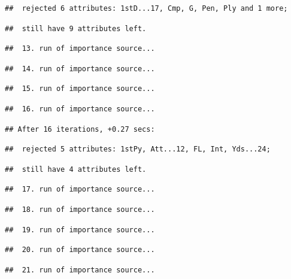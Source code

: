 \documentclass[
]{article}
\begin{document}
\begin{verbatim}
##  rejected 6 attributes: 1stD...17, Cmp, G, Pen, Ply and 1 more;
\end{verbatim}

\begin{verbatim}
##  still have 9 attributes left.
\end{verbatim}

\begin{verbatim}
##  13. run of importance source...
\end{verbatim}

\begin{verbatim}
##  14. run of importance source...
\end{verbatim}

\begin{verbatim}
##  15. run of importance source...
\end{verbatim}

\begin{verbatim}
##  16. run of importance source...
\end{verbatim}

\begin{verbatim}
## After 16 iterations, +0.27 secs:
\end{verbatim}

\begin{verbatim}
##  rejected 5 attributes: 1stPy, Att...12, FL, Int, Yds...24;
\end{verbatim}

\begin{verbatim}
##  still have 4 attributes left.
\end{verbatim}

\begin{verbatim}
##  17. run of importance source...
\end{verbatim}

\begin{verbatim}
##  18. run of importance source...
\end{verbatim}

\begin{verbatim}
##  19. run of importance source...
\end{verbatim}

\begin{verbatim}
##  20. run of importance source...
\end{verbatim}

\begin{verbatim}
##  21. run of importance source...
\end{verbatim}
\end{document}
